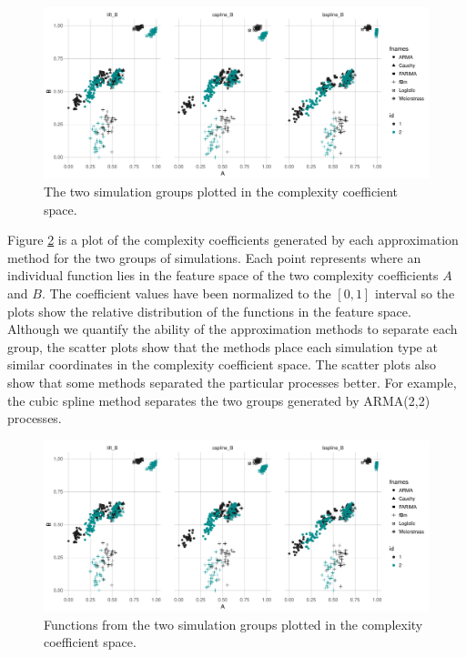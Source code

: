 \begin{figure}[!htbp]
  \begin{center}
  \includegraphics[width = \textwidth, keepaspectratio]{./figs/ecomplex_approx-feature-space.pdf}
  \end{center}
  \caption{The two simulation groups plotted in the 
  complexity coefficient space.}
  \label{fig:feature-space} 
\end{figure}


Figure \ref{fig:feature-space} is a plot of the complexity coefficients generated by each approximation method for the two groups of simulations. Each point represents where an individual function lies in the feature space of the two complexity coefficients $A$ and $B$. The coefficient values have been normalized to the $[0,1]$ interval so the plots show the relative distribution of the functions in the feature space.
Although we quantify the ability of the approximation methods to 
separate each group, the scatter plots show that the methods 
place each simulation type at similar coordinates in the 
complexity coefficient space. The scatter plots also show 
that some methods separated the particular processes better. 
For example, the cubic spline method separates the two groups 
generated by ARMA(2,2) processes.

\begin{figure}[!htbp]
  \begin{center}
  \includegraphics[width = \textwidth, keepaspectratio]{./figs/ecomplex_approx-feature-space.pdf}
  \end{center}
  \caption{Functions from the two simulation groups plotted in the 
  complexity coefficient space.}
  \label{fig:feature-space} 
\end{figure}

